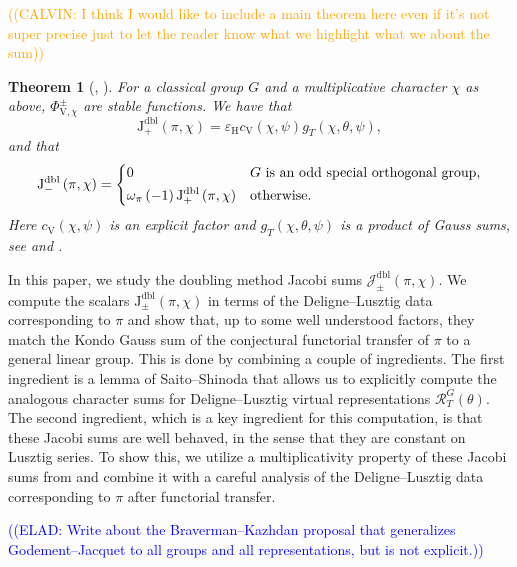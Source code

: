 \documentclass[12pt, reqno]{amsart}
\newtheorem{theorem}{Theorem}[section]
\theoremstyle{definition}
\theoremstyle{definition}
\theoremstyle{definition}
\newcommand{\hermitianSpace}{\mathrm{V}}
\newcommand{\fieldCharacter}{\psi}
\newcommand{\centralCharacter}[1]{\omega_{#1}}
\newcommand{\dblJacobiSum}[2]{\mathcal{J}_{\pm}^{\mathrm{dbl}}\left(#1, #2\right)}
\newcommand{\genHermitianJacobiKernel}[2]{\Phi^{\pm}_{#1,#2}}
\newcommand{\dblJacobiSumScalar}[2]{\mathrm{J}_{\pm}^{\mathrm{dbl}}\left(#1, #2\right)}
\newcommand{\posDblJacobiSumScalar}[2]{\mathrm{J}_{+}^{\mathrm{dbl}}\left(#1, #2\right)}
\newcommand{\negDblJacobiSumScalar}[2]{\mathrm{J}_{-}^{\mathrm{dbl}}\left(#1, #2\right)}
\newcommand{\algebraicGroup}[1]{\boldsymbol{\mathrm{#1}}}
\newcommand{\RTThetaVirtual}[3]{\mathcal{R}_{#1}^{#2}(#3)}
\newcommand{\calvin}[1]{\textcolor{orange}{\sffamily ((CALVIN: #1))}}
\newcommand{\elad}[1]{\textcolor{blue}{\sffamily ((ELAD: #1))}}
\begin{document}
\calvin{I think I would like to include a main theorem here even if it's not super precise just to let the reader know what we highlight what we about the sum}
\begin{theorem}[, ]
	For a classical group $G$ and a multiplicative character $\chi$ as above, $\genHermitianJacobiKernel{\hermitianSpace}{\chi}$ are stable functions. We have that
	$$\posDblJacobiSumScalar{\pi}{\chi} =
		\varepsilon_{\algebraicGroup{H}} c_{\hermitianSpace}\left(\chi, \fieldCharacter\right) g_T\left(\chi, \theta, \fieldCharacter\right),$$
		and that
	$$\negDblJacobiSumScalar{\pi}{\chi} = \begin{dcases} 0 & G \text{ is an odd special orthogonal group},\\
		\centralCharacter{\pi}\left(-1\right) \posDblJacobiSumScalar{\pi}{\chi} &  \text{otherwise.}
	\end{dcases}$$
Here $c_{\hermitianSpace}\left(\chi, \fieldCharacter\right)$ is an explicit factor and
$g_T\left(\chi, \theta, \fieldCharacter\right)$ is a product of Gauss sums, see  and .
\end{theorem}
In this paper, we study the doubling method Jacobi sums $\dblJacobiSum{\pi}{\chi}$. We compute the scalars $\dblJacobiSumScalar{\pi}{\chi}$ in terms of the Deligne--Lusztig data corresponding to $\pi$ and show that, up to some well understood factors, they match the Kondo Gauss sum of the conjectural functorial transfer of $\pi$ to a general linear group. This is done by combining a couple of ingredients. The first ingredient is a lemma of Saito--Shinoda \cite{SaitoShinoda2000} that allows us to explicitly compute the analogous character sums for Deligne--Lusztig virtual representations $\RTThetaVirtual{T}{G}{\theta}$.  The second ingredient, which is a key ingredient for this computation, is that these Jacobi sums are well behaved, in the sense that they are constant on Lusztig series. To show this, we utilize a multiplicativity property of these Jacobi sums from \cite{GirschZelingher2025} and combine it with a careful analysis of the Deligne--Lusztig data corresponding to $\pi$ after functorial transfer. 


\elad{Write about the Braverman--Kazhdan proposal that generalizes Godement--Jacquet to all groups and all representations, but is not explicit.}
\end{document}
